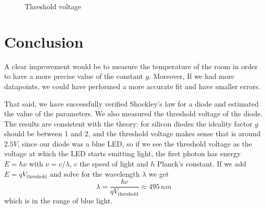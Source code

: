 \begin{figure}
    \centering
{}
\caption{Threshold voltage}\label{fig:threshold}
\end{figure}

\section{Conclusion}
A clear improvement would be to measure the temperature of
the room in order to have a more precise value of the constant \(g\). Moreover,
If we had more datapoints, we could have performed a more accurate fit and have
smaller errors. 

That said, we have successfully verified Shockley's law for a diode and
estimated the value of the parameters. We also measured the threshold voltage of
the diode. The results are consistent with the theory: for silicon diodes the
ideality factor \(g\) should be between 1 and 2, and the threshold voltage makes
sense that is around \(2.5V\), since our diode was a blue LED, so if we see the
threshold voltage as the voltage at which the LED starts emitting light, the
first photon has energy \(E = h\nu\) with \(\nu = c/\lambda \), \(c\) the speed of light and \(h\) Planck's constant. If we
add \(E = qV_\text{threshold}  \) and solve for the wavelength \(\lambda\) we get
\[
    \lambda = \frac{hc}{qV_\text{threshold}  } \approx 495 \, nm
\]
which is in the range of blue light.


